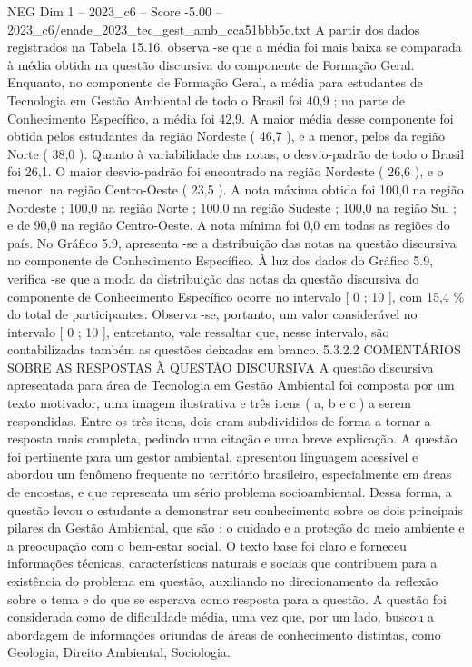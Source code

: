 \begin{textsample}{NEG Dim 1 – 2023\_c6 – Score -5.00 – 2023\_c6/enade\_2023\_tec\_gest\_amb\_cca51bbb5c.txt}
A partir dos dados registrados na Tabela 15.16, observa -se que a média foi mais baixa se comparada à média obtida na questão discursiva do componente de Formação Geral.
Enquanto, no componente de Formação Geral, a média para estudantes de Tecnologia em Gestão Ambiental de todo o Brasil foi 40,9 ; na parte de Conhecimento Específico, a média foi 42,9.
A maior média desse componente foi obtida pelos estudantes da região Nordeste ( 46,7 ), e a menor, pelos da região Norte ( 38,0 ).
Quanto à variabilidade das notas, o desvio-padrão de todo o Brasil foi 26,1.
O maior desvio-padrão foi encontrado na região Nordeste ( 26,6 ), e o menor, na região Centro-Oeste ( 23,5 ).
A nota máxima obtida foi 100,0 na região Nordeste ; 100,0 na região Norte ; 100,0 na região Sudeste ; 100,0 na região Sul ; e de 90,0 na região Centro-Oeste.
A nota mínima foi 0,0 em todas as regiões do país.
No Gráfico 5.9, apresenta -se a distribuição das notas na questão discursiva no componente de Conhecimento Específico.
À luz dos dados do Gráfico 5.9, verifica -se que a moda da distribuição das notas da questão discursiva do componente de Conhecimento Específico ocorre no intervalo [ 0 ; 10 ], com 15,4 \% do total de participantes.
Observa -se, portanto, um valor considerável no intervalo [ 0 ; 10 ], entretanto, vale ressaltar que, nesse intervalo, são contabilizadas também as questões deixadas em branco. 5.3.2.2 COMENTÁRIOS SOBRE AS RESPOSTAS À QUESTÃO DISCURSIVA A questão discursiva apresentada para área de Tecnologia em Gestão Ambiental foi composta por um texto motivador, uma imagem ilustrativa e três itens ( a, b e c ) a serem respondidas.
Entre os três itens, dois eram subdivididos de forma a tornar a resposta mais completa, pedindo uma citação e uma breve explicação.
A questão foi pertinente para um gestor ambiental, apresentou linguagem acessível e abordou um fenômeno frequente no território brasileiro, especialmente em áreas de encostas, e que representa um sério problema socioambiental.
Dessa forma, a questão levou o estudante a demonstrar seu conhecimento sobre os dois principais pilares da Gestão Ambiental, que são : o cuidado e a proteção do meio ambiente e a preocupação com o bem-estar social.
O texto base foi claro e forneceu informações técnicas, características naturais e sociais que contribuem para a existência do problema em questão, auxiliando no direcionamento da reflexão sobre o tema e do que se esperava como resposta para a questão.
A questão foi considerada como de dificuldade média, uma vez que, por um lado, buscou a abordagem de informações oriundas de áreas de conhecimento distintas, como Geologia, Direito Ambiental, Sociologia.

\end{textsample}
